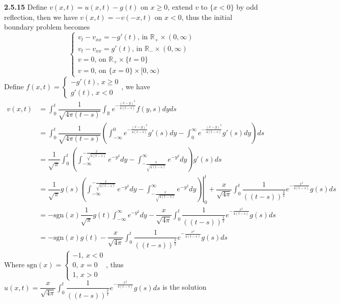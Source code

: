 \documentclass[../main.tex]{subfiles}
\begin{document}
\begin{customproblem}\textbf{2.5.15}
Define $v(x,t)=u(x,t)-g(t)$ on $x\geq 0$, extend $v$ to $\{x<0\}$ by odd reflection, then we have $v(x,t)=-v(-x,t)$ on $x<0$, thus the initial boundary problem becomes
\[
\left\{\begin{matrix}
v_{t}-v_{xx}=-g'(t),\,\text{in }\mathbb{R}_{+}\times(0,\infty)\\ 
v_{t}-v_{xx}=g'(t),\,\text{in }\mathbb{R}_{-}\times(0,\infty)\\
v=0,\,\text{on }\mathbb{R}_{+}\times\{t=0\}\\ 
v=0,\,\text{on }\{x=0\}\times[0,\infty)
\end{matrix}\right.
\]
Define $f(x,t)=
\left\{\begin{matrix}
-g'(t),\,x\geq 0\\ 
g'(t),\,x<0
\end{matrix}\right.$, we have
\[
\begin{aligned}
v(x,t)
&=\int_{0}^{t}\dfrac{1}{\sqrt{4\pi(t-s)}}\int_{\mathbb{R}}e^{-\frac{(x-y)^{2}}{4(t-s)}}f(y,s)dyds \\
&=\int_{0}^{t}\dfrac{1}{\sqrt{4\pi(t-s)}}\left(\int_{-\infty}^{0}e^{-\frac{(x-y)^{2}}{4(t-s)}}g'(s)dy-\int_{0}^{\infty}e^{-\frac{(x-y)^{2}}{4(t-s)}}g'(s)dy\right)ds \\
&=\dfrac{1}{\sqrt{\pi}}\int_{0}^{t}\left(\int_{-\infty}^{-\frac{x}{\sqrt{4(t-s)}}}e^{-y^{2}}dy-\int_{-\frac{x}{\sqrt{4(t-s)}}}^{\infty}e^{-y^{2}}dy\right)g'(s)ds \\
&=\left.\dfrac{1}{\sqrt{\pi}}g(s)\left(\int_{-\infty}^{-\frac{x}{\sqrt{4(t-s)}}}e^{-y^{2}}dy-\int_{-\frac{x}{\sqrt{4(t-s)}}}^{\infty}e^{-y^{2}}dy\right)\right\vert_{0}^{t}+\dfrac{x}{\sqrt{4\pi}}\int_{0}^{t}\dfrac{1}{\left((t-s)\right)^{\frac{3}{2}}}e^{-\frac{x^{2}}{4(t-s)}}g(s)ds \\
&=-\mathrm{sgn}(x)\dfrac{1}{\sqrt{\pi}}g(t)\int_{-\infty}^{\infty}e^{-y^{2}}dy-\dfrac{x}{\sqrt{4\pi}}\int_{0}^{t}\dfrac{1}{\left((t-s)\right)^{\frac{3}{2}}}e^{-\frac{x^{2}}{4(t-s)}}g(s)ds \\
&=-\mathrm{sgn}(x)g(t)-\dfrac{x}{\sqrt{4\pi}}\int_{0}^{t}\dfrac{1}{\left((t-s)\right)^{\frac{3}{2}}}e^{-\frac{x^{2}}{4(t-s)}}g(s)ds 
\end{aligned}
\]
Where $\mathrm{sgn}(x)=\left\{\begin{matrix}
-1,\,x<0\\ 
0,\,x=0\\ 
1,\,x>0
\end{matrix}\right.$, thus $\displaystyle u(x,t)=\dfrac{x}{\sqrt{4\pi}}\int_{0}^{t}\dfrac{1}{\left((t-s)\right)^{\frac{3}{2}}}e^{-\frac{x^{2}}{4(t-s)}}g(s)ds$ is the solution
\end{customproblem}
\end{document}
